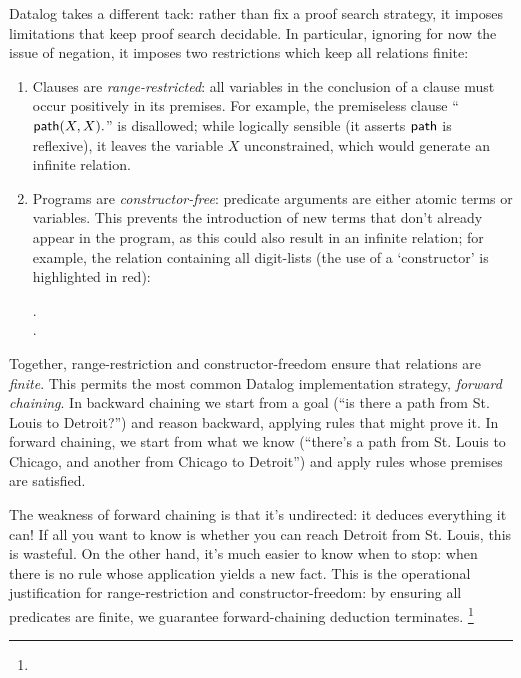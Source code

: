 Datalog takes a different tack: rather than fix a proof search strategy, it
imposes limitations that keep proof search decidable. In particular, ignoring
for now the issue of negation, it imposes two restrictions which keep all
 relations finite:

\begin{enumerate}
\item Clauses are \emph{range-restricted}: all variables in the conclusion of a
  clause must occur positively in its premises. For example, the premiseless
  clause ``$\text{\sffamily path}({X,X}).$'' is disallowed; while logically sensible (it
  asserts $\text{\sffamily path}$ is reflexive), it leaves the variable $X$ unconstrained,
  which would generate an infinite relation.

\item Programs are \emph{constructor-free}: predicate arguments are either
  atomic terms or variables. This prevents the introduction of new terms that
  don't already appear in the program, as this could also result in an infinite
  relation; for example, the relation containing all digit-lists (the use of a
  `constructor' is highlighted in {\color{Red}red}):

  \nopagebreak[3]
  \begin{datalog}
    .
    \\
     \gets
     \conj {}.
  \end{datalog}
\end{enumerate}

\noindent
Together, range-restriction and constructor-freedom ensure that relations are
\emph{finite}. This permits the most common Datalog implementation strategy,
\emph{forward chaining}.
%
In backward chaining we start from a goal (``is there a path from St.
Louis to Detroit?'') and reason backward, applying rules that might prove it.
%
In forward chaining, we start from what we know (``there's a path from
St. Louis to Chicago, and another from Chicago to Detroit'') and apply rules
whose premises are satisfied.

The weakness of forward chaining is that it's undirected: it deduces everything
it can! If all you want to know is whether you can reach Detroit from St. Louis,
this is wasteful. On the other hand, it's much easier to know when to stop: when
there is no rule whose application yields a new fact. This is the operational
justification for range-restriction and constructor-freedom: by ensuring all
predicates are finite, we guarantee forward-chaining deduction terminates.%
%
\footnote{}

